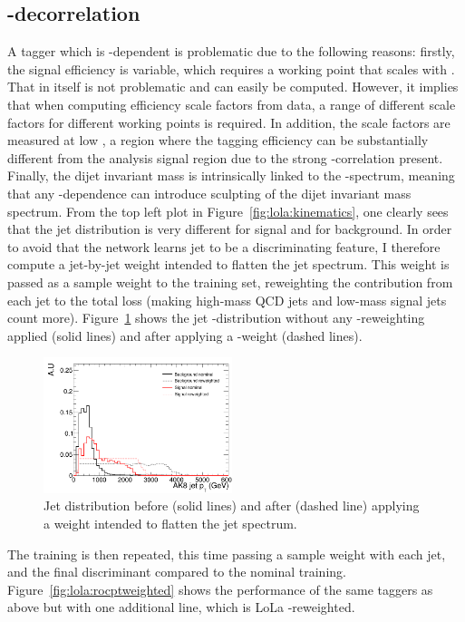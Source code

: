 \subsection{\PT-decorrelation}
\label{sec:lola:ptdep}
A tagger which is \PT-dependent is problematic due to the following reasons: firstly, the signal efficiency is variable, which requires a working point that scales with \PT. That in itself is not problematic and can easily be computed. However, it implies that when computing efficiency scale factors from data, a range of different scale factors for different working points is required. In addition, the scale factors are measured at low \PT, a region where the tagging efficiency can be substantially different from the analysis signal region due to the strong \PT-correlation present. Finally, the dijet invariant mass is intrinsically linked to the \PT-spectrum, meaning that any \PT-dependence can introduce sculpting of the dijet invariant mass spectrum. From the top left plot in Figure~\ref{fig:lola:kinematics}, one clearly sees that the jet \PT distribution is very different for signal and for background. In order to avoid that the network learns jet \PT to be a discriminating feature, I therefore compute a jet-by-jet weight intended to flatten the jet \PT spectrum. This weight is passed as a sample weight to the training set, reweighting the contribution from each jet to the total loss (making high-mass QCD jets and low-mass signal jets count more). Figure~\ref{fig:lola:ptweight} shows the jet \PT-distribution without any \PT-reweighting applied (solid lines) and after applying a \PT-weight (dashed lines).
\begin{figure}[h!]
\centering
\includegraphics[width=0.49\textwidth]{figures/vtagging/AN-18-099/input/pt_reweighted/postWeight.png}
\caption{Jet \PT distribution before (solid lines) and after (dashed line) applying a weight intended to flatten the jet \PT spectrum.}
\label{fig:lola:ptweight}
\end{figure}
The training is then repeated, this time passing a sample weight with each jet, and the final discriminant compared to the nominal training. Figure~\ref{fig:lola:rocptweighted} shows the performance of the same taggers as above but with one additional line, which is LoLa \PT-reweighted.
